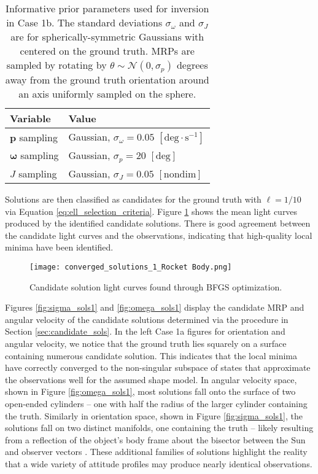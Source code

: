 \documentclass[a4paper,twocolumn]{spaceDebrisC} %
\newcommand{\vctr}[1]{\bm{#1}}
\newcommand{\figbig}[0]{0.5\textwidth}
\begin{document}
\begin{table}[H]
  \centering
  \caption{Informative prior parameters used for inversion in Case 1b. The standard deviations $\sigma_\omega$ and $\sigma_J$ are for spherically-symmetric Gaussians with centered on the ground truth. MRPs are sampled by rotating by $\theta\sim \mathcal{N}(0,\sigma_p)$ degrees away from the ground truth orientation around an axis uniformly sampled on the sphere.}
  \vspace*{6pt}
  \begin{tabular}{|l|l|}
  \hline
  \textbf{Variable} & \textbf{Value} \\ \hline
  $\vctr{p}$ sampling & Gaussian, $\sigma_\omega = 0.05$ $[\text{deg}\cdot\text{s}^{-1}]$ \\ \hline
  $\vctr{\omega}$ sampling & Gaussian, $\sigma_p=20$ $[\text{deg}]$ \\ \hline
  $J$ sampling & Gaussian, $\sigma_J = 0.05$ $[\text{nondim}]$ \\ \hline
\end{tabular}
  \label{tb:case1b_prior}
\end{table}

Solutions are then classified as candidates for the ground truth with $\ell = 1/10$ via Equation \ref{eq:ell_selection_criteria}. Figure \ref{fig:conv_lcs_synth} shows the mean light curves produced by the identified candidate solutions. There is good agreement between the candidate light curves and the observations, indicating that high-quality local minima have been identified.

\begin{figure}[H]
  \centering
  \texttt{[image: converged\_solutions\_1\_Rocket Body.png]}
  \caption{Candidate solution light curves found through BFGS optimization.}
  \label{fig:conv_lcs_synth}
\end{figure}

Figures \ref{fig:sigma_sols1} and \ref{fig:omega_sols1} display the candidate MRP and angular velocity of the candidate solutions determined via the procedure in Section \ref{sec:candidate_sols}. In the left Case 1a figures for orientation and angular velocity, we notice that the ground truth lies squarely on a surface containing numerous candidate solution. This indicates that the local minima have correctly converged to the non-singular subspace of states that approximate the observations well for the assumed shape model. In angular velocity space, shown in Figure \ref{fig:omega_sols1}, most solutions fall onto the surface of two open-ended cylinders -- one with half the radius of the larger cylinder containing the truth. Similarly in orientation space, shown in Figure \ref{fig:sigma_sols1}, the solutions fall on two distinct manifolds, one containing the truth -- likely resulting from a reflection of the object's body frame about the bisector between the Sun and observer vectors \cite{marto2024, burton2024journal}. These additional families of solutions highlight the reality that a wide variety of attitude profiles may produce nearly identical observations.
\end{document}

